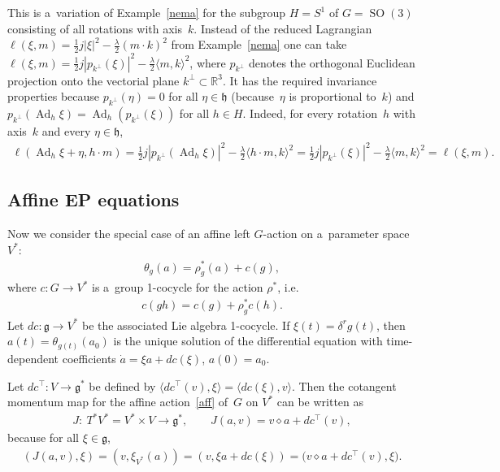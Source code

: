 \documentclass[10pt,a4paper]{amsart}
\numberwithin{equation}{section}
\begin{document}
\begin{Example}
This is a~variation of Example~\ref{nema} for the subgroup $H=S^1$ of $G=\operatorname{SO}(3)$ consisting of all
rotations with axis~$k$.
Instead of the reduced Lagrangian $\ell(\xi,m)=\frac12 j|\xi|^2-\frac{\lambda}2(m\cdot k)^2$ from Example~\ref{nema} one
can take $\ell(\xi,m)=\frac12 j|p_{k^\perp}(\xi)|^2-\frac{\lambda}2 \langle m, k\rangle^2$, where $p_{k^\perp}$ denotes
the orthogonal Euclidean projection onto the vectorial plane $k^\perp\subset\mathbb R^3$.
It has the required invariance properties because $p_{k^\perp}(\eta)=0$ for all $\eta\in\mathfrak h$ (because~$\eta$ is
proportional to~$k$) and $p_{k^\perp}(\operatorname{Ad}_h\xi)=\operatorname{Ad}_{h}(p_{k^\perp}(\xi))$ for all $h\in H$.
Indeed, for every rotation~$h$ with axis~$k$ and every $\eta\in\mathfrak h$,
\begin{gather*}
\ell(\operatorname{Ad}_h\xi+\eta,h\cdot m)=\frac12 j|p_{k^\perp}(\operatorname{Ad}_h\xi)|^2-\frac{\lambda}{2}\langle
h\cdot m,k\rangle^2=\frac12 j|p_{k^\perp}(\xi)|^2-\frac{\lambda}{2}\langle m,k\rangle^2=\ell(\xi,m).
\end{gather*}
\end{Example}

\subsection{Af\/f\/ine EP equations}

Now we consider the special case of an af\/f\/ine left $G$-action on a~parameter space $V^*$:
\begin{gather}
\label{aff}
\theta_g(a)=\rho^*_{g}(a)+c(g),
\end{gather}
where $c:G\to V^*$ is a~group 1-cocycle for the action $\rho^*$, i.e.\
\begin{gather*}
c(gh)= c(g)+\rho^*_{g} c(h).
\end{gather*}
Let $dc:\mathfrak g\to V^*$ be the associated Lie algebra 1-cocycle.
If $\xi(t)=\delta^rg(t)$, then $a(t)=\theta_{g(t)}(a_0)$ is the unique solution of the dif\/ferential equation with
time-dependent coef\/f\/icients $\dot{a}=\xi a+dc(\xi)$, $ a(0)=a_0$.

\begin{Remark}
Let $dc^\top:V\to\mathfrak g^*$ be def\/ined by $\langle dc^\top(v),\xi\rangle=\langle dc(\xi),v\rangle$.
Then the cotangent momentum map for the af\/f\/ine action~\eqref{aff} of~$G$ on $V^*$ can be written as
\begin{gather}
\label{cota}
J: \ T^*V^*=V^*\times V\to\mathfrak g^*,
\qquad
J(a,v)=v\diamond a+dc^\top(v),
\end{gather}
because for all $\xi\in\mathfrak g$,
\begin{gather*}
(J(a,v),\xi)=(v,\xi_{V^*}(a))=(v,\xi a+dc(\xi))=\big(v\diamond a+dc^\top(v),\xi\big).
\end{gather*}
\end{Remark}
\end{document}
